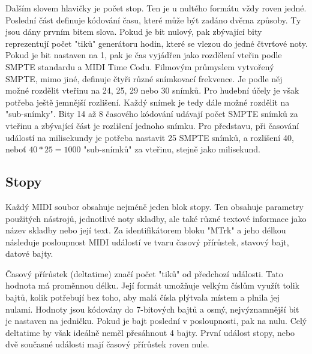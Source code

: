 Dalším slovem hlavičky je počet stop.
Ten je u nultého formátu vždy roven jedné.
Poslední část definuje kódování času, 
které může být zadáno dvěma způsoby.
Ty jsou dány prvním bitem slova.
Pokud je bit nulový, 
pak zbývající bity reprezentují počet "tiků" generátoru hodin, 
které se vlezou do jedné čtvrťové noty.
Pokud je bit nastaven na 1, 
pak je čas vyjádřen jako rozdělení vteřin podle SMPTE standardu
a MIDI Time Codu.
\cite{Back_SMF_Specif}
Filmovým průmyslem vytvořený SMPTE, mimo jiné, 
definuje čtyři různé snímkovací frekvence.
Je podle něj možné rozdělit vteřinu na 24, 25, 29 nebo 30 snímků.
Pro hudební účely je však potřeba ještě jemnější rozlišení.
Každý snímek je tedy dále možné rozdělit na "sub-snímky".
\cite{Neznamy_aboutMIDIFiles}
Bity 14 až 8 časového kódování udávají počet SMPTE snímků za vteřinu 
a zbývající část je rozlišení jednoho snímku.
Pro představu,
při časování událostí na milisekundy je potřeba nastavit 25 SMPTE snímků,
a rozlišení 40, neboť $ 40 * 25 = 1000 $ "sub-snímků" za vteřinu, 
stejně jako milisekund. 
\cite{Back_SMF_Specif}
\par

\subsection{Stopy}
Každý MIDI soubor obsahuje nejméně jeden blok stopy.
Ten obsahuje parametry použitých nástrojů, jednotlivé noty skladby, 
ale také různé textové informace jako název skladby nebo její text.
Za identifikátorem bloku "MTrk" a jeho délkou 
následuje posloupnost MIDI událostí
ve tvaru časový přírůstek, stavový bajt, datové bajty.
\cite{Back_SMF_Specif}
\par

Časový přírůstek (deltatime) značí počet "tiků" od předchozí události.
Tato hodnota má proměnnou délku.
Její formát umožňuje velkým číslům využít tolik bajtů, 
kolik potřebují bez toho,
aby malá čísla plýtvala místem a plnila jej nulami.
Hodnoty jsou kódovány do 7-bitových bajtů 
a osmý, nejvýznamnější bit je nastaven na jedničku.
Pokud je bajt poslední v posloupnosti, pak na nulu.
Celý deltatime by však ideálně neměl přesáhnout 4 bajty.
\cite{Neznamy_aboutMIDIFiles}
První událost stopy, nebo dvě současné události 
mají časový přírůstek roven nule.
\cite{Back_SMF_Specif}
\par

